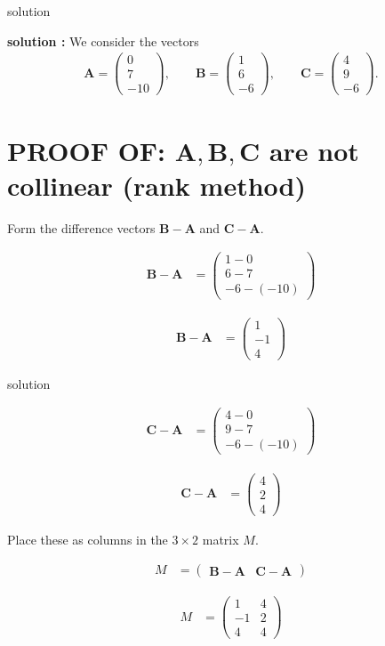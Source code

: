 \documentclass{beamer}
\numberwithin{equation}{section}
\theoremstyle{remark}
\newcommand{\myvec}[1]{\ensuremath{\begin{pmatrix}#1\end{pmatrix}}}
\let\vec\mathbf
\begin{document}
\begin{frame}{solution}
 

\textbf{solution :}
We consider the vectors
\begin{align*}
\vec{A} = \myvec{0\\7\\-10}, \qquad
\vec{B} = \myvec{1\\6\\-6}, \qquad
\vec{C} = \myvec{4\\9\\-6}.
\end{align*}

\section*{ PROOF OF: $\vec{A},\vec{B},\vec{C}$ are not collinear (rank method)}
Form the difference vectors $\vec{B}-\vec{A}$ and $\vec{C}-\vec{A}$.

\begin{align}
\vec{B}-\vec{A} &= \myvec{1-0\\[4pt]6-7\\[4pt]-6-(-10)}
\end{align}

\begin{align}
\vec{B}-\vec{A} &= \myvec{1\\-1\\4}
\end{align}

\end{frame}
\begin{frame}{solution}

\begin{align}
\vec{C}-\vec{A} &= \myvec{4-0\\[4pt]9-7\\[4pt]-6-(-10)}
\end{align}

\begin{align}
\vec{C}-\vec{A} &= \myvec{4\\2\\4}
\end{align}

Place these as columns in the $3\times 2$ matrix $M$.

\begin{align}
M &= \begin{pmatrix} \vec{B}-\vec{A} & \vec{C}-\vec{A} \end{pmatrix}
\end{align}

\begin{align}
M &= \begin{pmatrix}
1 & 4\\[4pt]
-1 & 2\\[4pt]
4 & 4
\end{pmatrix}
\end{align}

\end{frame}
\end{document}
